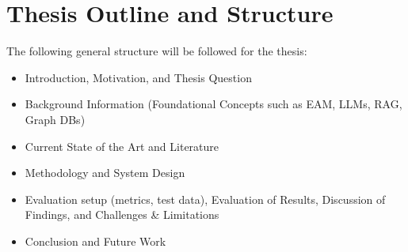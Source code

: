 \documentclass[english]{lni}
\begin{document}
\section{Thesis Outline and Structure}
The following general structure will be followed for the thesis:

\begin{itemize}
    \item Introduction, Motivation, and Thesis Question
    \item Background Information (Foundational Concepts such as EAM, LLMs, RAG, Graph DBs)
    \item Current State of the Art and Literature
    \item Methodology and System Design
    \item Evaluation setup (metrics, test data), Evaluation of Results, Discussion of Findings, and Challenges \& Limitations
    \item Conclusion and Future Work
\end{itemize}




\printbibliography
\end{document}

